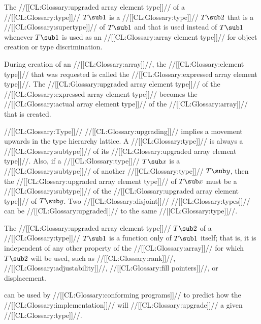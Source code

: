 





The //[[CL:Glossary:upgraded array element type]]// of a //[[CL:Glossary:type]]// $T\sub 1$
is a //[[CL:Glossary:type]]// $T\sub 2$ that is a //[[CL:Glossary:supertype]]// of $T\sub 1$
and that is used instead of $T\sub 1$ whenever $T\sub 1$
is used as an //[[CL:Glossary:array element type]]// 
for object creation or type discrimination.

During creation of an //[[CL:Glossary:array]]//,
the //[[CL:Glossary:element type]]// that was requested 
is called the //[[CL:Glossary:expressed array element type]]//.
The //[[CL:Glossary:upgraded array element type]]// of the //[[CL:Glossary:expressed array element type]]//
becomes the //[[CL:Glossary:actual array element type]]// of the //[[CL:Glossary:array]]// that is created.


//[[CL:Glossary:Type]]// //[[CL:Glossary:upgrading]]// implies a movement upwards in the type hierarchy lattice.
A //[[CL:Glossary:type]]// is always a //[[CL:Glossary:subtype]]// of its //[[CL:Glossary:upgraded array element type]]//.
Also, if a //[[CL:Glossary:type]]// $T\sub x$ is a //[[CL:Glossary:subtype]]// of another //[[CL:Glossary:type]]// $T\sub y$,
then
the //[[CL:Glossary:upgraded array element type]]// of $T\sub x$ 
must be a //[[CL:Glossary:subtype]]// of
the //[[CL:Glossary:upgraded array element type]]// of $T\sub y$.
Two //[[CL:Glossary:disjoint]]// //[[CL:Glossary:types]]// can be //[[CL:Glossary:upgraded]]// to the same //[[CL:Glossary:type]]//.

The //[[CL:Glossary:upgraded array element type]]// $T\sub 2$ of a //[[CL:Glossary:type]]// $T\sub 1$
is a function only of $T\sub 1$ itself;
that is, it is independent of any other property of the //[[CL:Glossary:array]]// 
for which $T\sub 2$ will be used,
such as //[[CL:Glossary:rank]]//, //[[CL:Glossary:adjustability]]//, //[[CL:Glossary:fill pointers]]//, or displacement.




can be used by //[[CL:Glossary:conforming programs]]// to predict how the //[[CL:Glossary:implementation]]//
will //[[CL:Glossary:upgrade]]// a given //[[CL:Glossary:type]]//.



\endsubsubsection%

